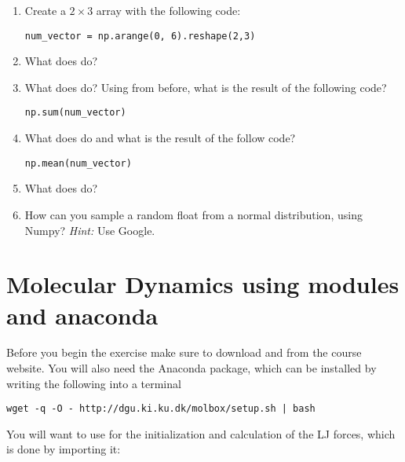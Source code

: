 \documentclass{article}
\begin{document}
\begin{enumerate}[resume]
   \item Create a $2\times 3$ array with the following code:

\begin{lstlisting}
num_vector = np.arange(0, 6).reshape(2,3)
\end{lstlisting}

   \item What does  do?

   \item What does  do? Using  from before, what is the result of the following code?

\begin{lstlisting}
np.sum(num_vector)
\end{lstlisting}


   \item What does  do and what is the result of the follow code?

\begin{lstlisting}
np.mean(num_vector)
\end{lstlisting}

   \item What does  do?

   \item How can you sample a random float from a normal distribution, using Numpy? \newline
       {\em Hint:} Use Google.

\end{enumerate}


\newpage


\section{Molecular Dynamics using modules and anaconda}

Before you begin the exercise make sure to download  and  from the course website.
You will also need the Anaconda package, which can be installed by writing the following into a terminal
\begin{lstlisting}
wget -q -O - http://dgu.ki.ku.dk/molbox/setup.sh | bash
\end{lstlisting}

You will want to use  for the initialization and calculation of the LJ forces, which is done by importing it:
\end{document}
